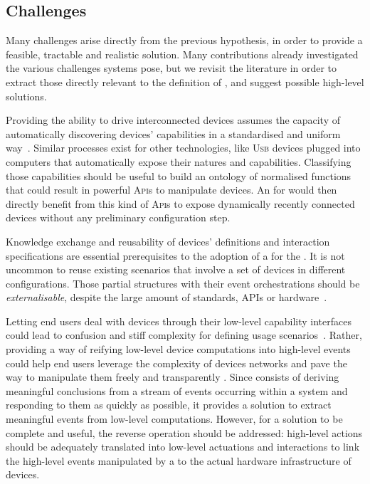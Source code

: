 \subsection{Challenges}
\label{sec:Motivation-Challenges}

Many challenges arise directly from the previous hypothesis, in order to provide a feasible, tractable and realistic \IOT solution. Many contributions already investigated the various challenges \IOT systems pose, but we revisit the literature in order to extract those directly relevant to the definition of \IOT \DSLS, and suggest possible high-level solutions.

\begin{description}[leftmargin=0cm]
	\item[Capability Discovery] Providing the ability to drive interconnected devices assumes the capacity of automatically discovering devices' capabilities in a standardised and uniform way~\cite{chaqfeh-12}. Similar processes exist for other technologies, like \textsc{Usb} devices plugged into computers that automatically expose their natures and capabilities. Classifying those capabilities should be useful to build an ontology of normalised functions that could result in powerful \textsc{Api}s to manipulate devices. An \DSL for \IOT would then directly benefit from this kind of \textsc{Api}s to expose dynamically recently connected devices without any preliminary configuration step.
	
	\item[Reusability] Knowledge exchange and reusability of devices' definitions and interaction specifications are essential prerequisites to the adoption of a \DSL for the \IOT. It is not uncommon to reuse existing scenarios that involve a set of devices in different configurations. Those partial \IOT structures with their event orchestrations should be \emph{externalisable}, despite the large amount of standards, \textsc{API}s or hardware~\cite{ma-14}.

	\item[Complex Event Processing (\CEP)] Letting end users deal with devices through their low-level capability interfaces could lead to confusion and stiff complexity for defining usage scenarios~\cite{ma-13}. Rather, providing a way of reifying low-level device computations into high-level events could help end users leverage the complexity of devices networks and pave the way to manipulate them freely and transparently \cite{cugola-12}. Since \CEP consists of deriving meaningful conclusions from a stream of events occurring within a system and responding to them as quickly as possible, it provides a solution to extract meaningful events from low-level computations. However, for a solution to be complete and useful, the reverse operation should be addressed: high-level actions should be adequately translated into low-level actuations and interactions to link the high-level events manipulated by a \DSL to the actual hardware infrastructure of devices.
	

\end{description}
